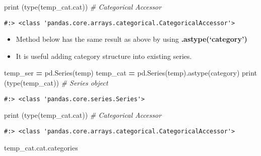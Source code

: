 \documentclass[
]{book}
\newenvironment{Shaded}{\begin{snugshade}}{\end{snugshade}}
\newcommand{\BuiltInTok}[1]{#1}
\newcommand{\CommentTok}[1]{\textcolor[rgb]{0.37,0.37,0.37}{\textit{#1}}}
\newcommand{\NormalTok}[1]{#1}
\newcommand{\OperatorTok}[1]{\textcolor[rgb]{0.43,0.43,0.43}{\textbf{#1}}}
\newcommand{\StringTok}[1]{\textcolor[rgb]{0.5,0.5,0.5}{#1}}
\providecommand{\tightlist}{%
  \setlength{\itemsep}{0pt}\setlength{\parskip}{0pt}}
\begin{document}
\begin{Shaded}
\begin{Highlighting}[]
\BuiltInTok{print}\NormalTok{ (}\BuiltInTok{type}\NormalTok{(temp\_cat.cat))   }\CommentTok{\# Categorical Accessor}
\end{Highlighting}
\end{Shaded}

\begin{verbatim}
#:> <class 'pandas.core.arrays.categorical.CategoricalAccessor'>
\end{verbatim}

\begin{itemize}
\tightlist
\item
  Method below has the same result as above by using \textbf{.astype(`category')}\\
\item
  It is useful adding category structure into existing series.
\end{itemize}

\begin{Shaded}
\begin{Highlighting}[]
\NormalTok{temp\_ser }\OperatorTok{=}\NormalTok{ pd.Series(temp)}
\NormalTok{temp\_cat }\OperatorTok{=}\NormalTok{ pd.Series(temp).astype(}\StringTok{\textquotesingle{}category\textquotesingle{}}\NormalTok{)}
\BuiltInTok{print}\NormalTok{ (}\BuiltInTok{type}\NormalTok{(temp\_cat))       }\CommentTok{\# Series object}
\end{Highlighting}
\end{Shaded}

\begin{verbatim}
#:> <class 'pandas.core.series.Series'>
\end{verbatim}

\begin{Shaded}
\begin{Highlighting}[]
\BuiltInTok{print}\NormalTok{ (}\BuiltInTok{type}\NormalTok{(temp\_cat.cat))   }\CommentTok{\# Categorical Accessor}
\end{Highlighting}
\end{Shaded}

\begin{verbatim}
#:> <class 'pandas.core.arrays.categorical.CategoricalAccessor'>
\end{verbatim}

\begin{Shaded}
\begin{Highlighting}[]
\NormalTok{temp\_cat.cat.categories}
\end{Highlighting}
\end{Shaded}
\end{document}
